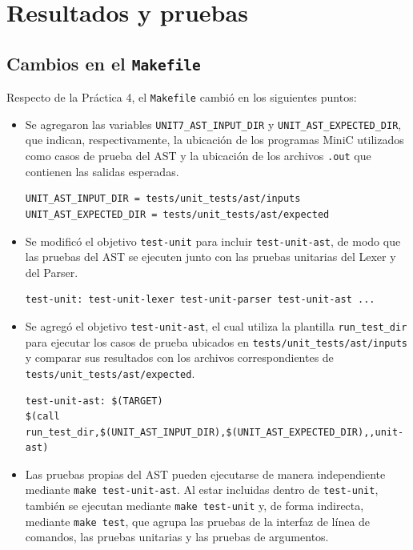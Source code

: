 \documentclass[12pt,letterpaper]{article}
\begin{document}
\section*{Resultados y pruebas}\label{sec:resultados}

\subsection*{Cambios en el \texttt{Makefile}}

Respecto de la Práctica 4, el \texttt{Makefile} cambió en los siguientes puntos:

\begin{itemize}

\item Se agregaron las variables \texttt{UNIT7\_AST\_INPUT\_DIR} y \texttt{UNIT\_AST\_EXPECTED\_DIR}, que indican,
respectivamente, la ubicación de los programas MiniC utilizados como casos de prueba del AST y la ubicación
de los archivos \texttt{.out} que contienen las salidas esperadas.

\begin{verbatim}
UNIT_AST_INPUT_DIR = tests/unit_tests/ast/inputs
UNIT_AST_EXPECTED_DIR = tests/unit_tests/ast/expected
\end{verbatim}

\item Se modificó el objetivo \texttt{test-unit} para incluir \texttt{test-unit-ast}, de modo que las pruebas
del AST se ejecuten junto con las pruebas unitarias del Lexer y del Parser.

\begin{verbatim}
test-unit: test-unit-lexer test-unit-parser test-unit-ast ...
\end{verbatim}

\item Se agregó el objetivo \texttt{test-unit-ast}, el cual utiliza la plantilla \texttt{run\_test\_dir} para
ejecutar los casos de prueba ubicados en \texttt{tests/unit\_tests/ast/inputs} y comparar sus resultados con
los archivos correspondientes de \texttt{tests/unit\_tests/ast/expected}.

\begin{verbatim}
test-unit-ast: $(TARGET)
$(call run_test_dir,$(UNIT_AST_INPUT_DIR),$(UNIT_AST_EXPECTED_DIR),,unit-ast)
\end{verbatim}

\item Las pruebas propias del AST pueden ejecutarse de manera independiente mediante
\texttt{make test-unit-ast}. Al estar incluidas dentro de \texttt{test-unit}, también se ejecutan mediante
\texttt{make test-unit} y, de forma indirecta, mediante \texttt{make test}, que agrupa las pruebas de la
interfaz de línea de comandos, las pruebas unitarias y las pruebas de argumentos.


\end{itemize}
\end{document}
